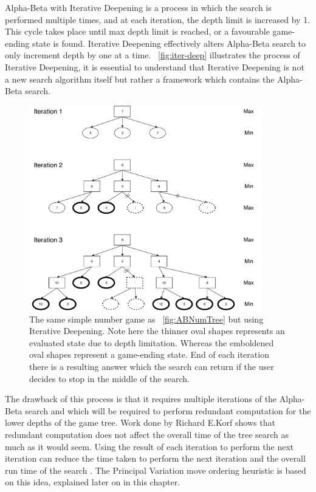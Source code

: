 \documentclass{l4proj}
\begin{document}
Alpha-Beta with Iterative Deepening is a process in which the search is performed multiple times, and at each iteration, the depth limit is increased by 1. This cycle takes place until max depth limit is reached, or a favourable game-ending state is found. Iterative Deepening effectively alters Alpha-Beta search to only increment depth by one at a time.  ~\autoref{fig:iter-deep} illustrates the process of Iterative Deepening, it is essential to understand that Iterative Deepening is not a new search algorithm itself but rather a framework which contains the Alpha-Beta search.


\begin{figure}[!ht]
\centering
\includegraphics[width=0.9\textwidth]{ABNumIDeep.pdf}
\caption{ The same simple number game as ~\autoref{fig:ABNumTree} but using Iterative Deepening. Note here the thinner oval shapes represents an evaluated state due to depth limitation. Whereas the emboldened oval shapes represent a game-ending state. End of each iteration there is a resulting answer which the search can return if the user decides to stop in the middle of the search.}
\label{fig:iter-deep}
\end{figure}


The drawback of this process is that it requires multiple iterations of the Alpha-Beta search and which will be required to perform redundant computation for the lower depths of the game tree. Work done by Richard E.Korf  shows that redundant computation does not affect the overall time of the tree search as much as it would seem. Using the result of each iteration to perform the next iteration can reduce the time taken to perform the next iteration and the overall run time of the search \citep{Korf1985}. The Principal Variation move ordering heuristic is based on this idea, explained later on in this chapter.
\end{document}
